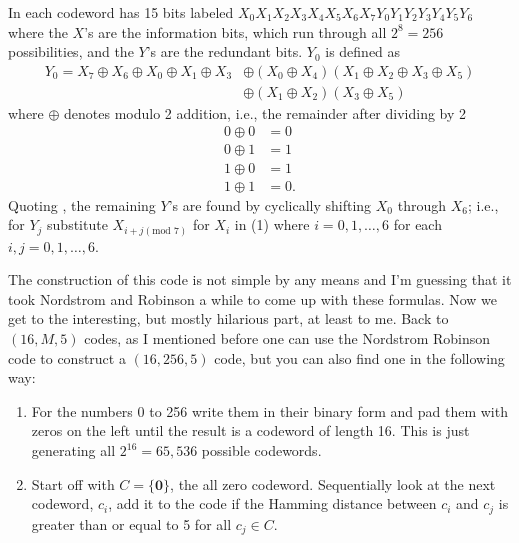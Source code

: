 \documentclass{article}
\theoremstyle{remark}
\begin{document}
	In \cite{NS} each codeword has 15 bits labeled $X_0X_1X_2X_3X_4X_5X_6X_7Y_0Y_1Y_2Y_3Y_4Y_5Y_6$ where the $X$'s are the information bits, which run through all $2^8=256$ possibilities, and the $Y$'s are the redundant bits.  $Y_0$ is defined as
	\begin{align}
		Y_0=X_7\oplus X_6\oplus X_0\oplus X_1\oplus X_3 & \oplus (X_0\oplus X_4)(X_1\oplus X_2\oplus X_3\oplus X_5) \nonumber \\
		& \oplus(X_1\oplus X_2)(X_3\oplus X_5)
	\end{align}
	where $\oplus$ denotes modulo 2 addition, i.e., the remainder after dividing by 2
	\begin{align*}
		0\oplus0 & =0 \\
		0\oplus1 & =1 \\
		1\oplus0 & =1 \\
		1\oplus1 & =0.
	\end{align*}
	Quoting \cite{NS}, the remaining $Y$'s are found by cyclically shifting $X_0$ through $X_6$; i.e., for $Y_j$ substitute $X_{i+j(\text{mod }7)}$ for $X_i$ in (1) where $i=0,1,\dots,6$ for each $i,j=0,1,\dots,6$.
	
	The construction of this code is not simple by any means and I'm guessing that it took Nordstrom and Robinson a while to come up with these formulas.  Now we get to the interesting, but mostly hilarious part, at least to me.  Back to $(16,M,5)$ codes, as I mentioned before one can use the Nordstrom Robinson code to construct a $(16,256,5)$ code, but you can also find one in the following way:
	\begin{enumerate}
		\item For the numbers 0 to 256 write them in their binary form and pad them with zeros on the left until the result is a codeword of length 16.  This is just generating all $2^{16}=65,536$ possible codewords.
		\item Start off with $C=\{\textbf{0}\}$, the all zero codeword.  Sequentially look at the next codeword, $c_i$, add it to the code if the Hamming distance between $c_i$ and $c_j$ is greater than or equal to 5 for all $c_j\in C$.
	\end{enumerate}
\end{document}
